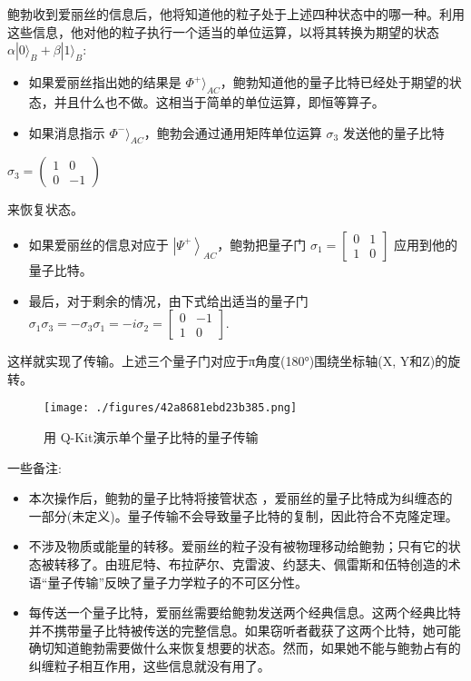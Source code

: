 鲍勃收到爱丽丝的信息后，他将知道他的粒子处于上述四种状态中的哪一种。利用这些信息，他对他的粒子执行一个适当的单位运算，以将其转换为期望的状态 $\alpha|0\rangle_B + \beta|1\rangle_B$:

\begin{itemize}
  \item 如果爱丽丝指出她的结果是 $\Phi^+\rangle_{AC}$，鲍勃知道他的量子比特已经处于期望的状态，并且什么也不做。这相当于简单的单位运算，即恒等算子。
  \item 如果消息指示 $\Phi^-\rangle_{AC}$，鲍勃会通过通用矩阵单位运算 $\sigma_3$ 发送他的量子比特
\end{itemize}

$\sigma_3 = \begin{pmatrix}1 & 0 \\0 & -1\end{pmatrix}$

来恢复状态。

\begin{itemize}
  \item 如果爱丽丝的信息对应于 $\left|\Psi^{+}\right\rangle_{AC}$，鲍勃把量子门
 $\sigma_{1}=\begin{bmatrix}  0 & 1 \\  1 & 0  \end{bmatrix}$
  应用到他的量子比特。
  \item 最后，对于剩余的情况，由下式给出适当的量子门
 $\sigma_{1}\sigma_{3}=-\sigma_{3}\sigma_{1}=-i\sigma_{2}=\begin{bmatrix}  0 & -1 \\  1 & 0  \end{bmatrix}$.
\end{itemize}

这样就实现了传输。上述三个量子门对应于π角度(180°)围绕坐标轴(X, Y和Z)的旋转。

\begin{figure}[ht]
\centering
\texttt{[image: ./figures/42a8681ebd23b385.png]}
\caption{用 Q-Kit演示单个量子比特的量子传输} \label{fig_LZYXCT_4}
\end{figure}

一些备注:

\begin{itemize}
\item 本次操作后，鲍勃的量子比特将接管状态    ，爱丽丝的量子比特成为纠缠态的一部分(未定义)。量子传输不会导致量子比特的复制，因此符合不克隆定理。
\item 不涉及物质或能量的转移。爱丽丝的粒子没有被物理移动给鲍勃；只有它的状态被转移了。由班尼特、布拉萨尔、克雷波、约瑟夫、佩雷斯和伍特创造的术语“量子传输”反映了量子力学粒子的不可区分性。
\item 每传送一个量子比特，爱丽丝需要给鲍勃发送两个经典信息。这两个经典比特并不携带量子比特被传送的完整信息。如果窃听者截获了这两个比特，她可能确切知道鲍勃需要做什么来恢复想要的状态。然而，如果她不能与鲍勃占有的纠缠粒子相互作用，这些信息就没有用了。
\end{itemize}

